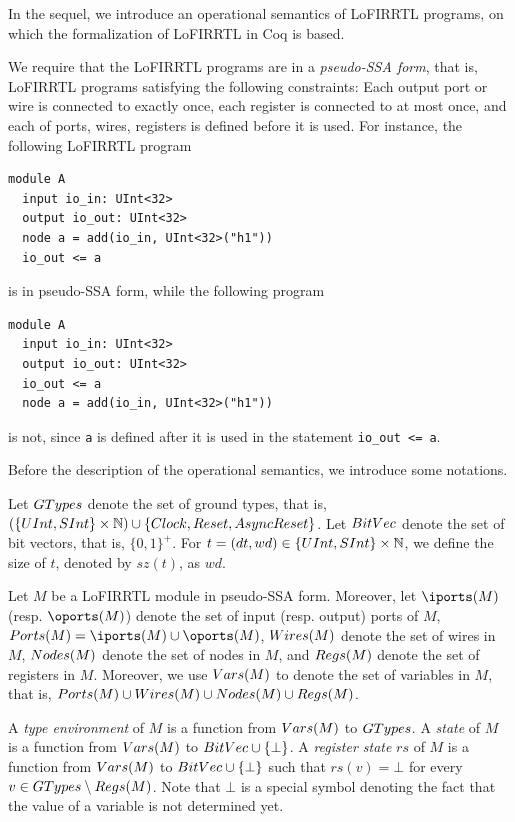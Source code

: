 
In the sequel, we introduce an operational semantics of LoFIRRTL programs, on which the formalization of LoFIRRTL in Coq is based. 

We require that the LoFIRRTL programs are in a \emph{pseudo-SSA form}, that is, LoFIRRTL programs satisfying the following constraints: Each output port or wire is connected to exactly once, each register is connected to at most once, and each of ports, wires, registers is defined before it is used. For instance, the following LoFIRRTL program
\begin{lstlisting}
module A
  input io_in: UInt<32>
  output io_out: UInt<32>
  node a = add(io_in, UInt<32>("h1"))
  io_out <= a
\end{lstlisting}
%
is in pseudo-SSA form, while the following program
\begin{lstlisting}
module A
  input io_in: UInt<32>
  output io_out: UInt<32>
  io_out <= a
  node a = add(io_in, UInt<32>("h1"))
\end{lstlisting}
is not, since {\tt a} is defined after it is used in the statement {\tt io\_out <= a}.

Before the description of the operational semantics, we introduce some notations. 

Let $GTypes$ denote the set of ground types, that is, $(\{UInt, SInt\} \times \mathbb{N}) \cup \{Clock, Reset, AsyncReset\}$. Let $BitVec$ denote the set of bit vectors, that is, $\{0,1\}^+$.
For $t = (dt, wd) \in \{UInt, SInt\} \times \mathbb{N}$, we define the size of $t$, denoted by $sz(t)$, as $wd$.

Let $M$ be a LoFIRRTL module in pseudo-SSA form. 
Moreover, let $\iports(M)$ (resp. $\oports(M)$) denote the set of input (resp. output) ports of $M$,  $\ports(M) = \iports(M) \cup \oports(M)$, $Wires(M)$ denote the set of wires in $M$, $Nodes(M)$ denote the set of nodes in $M$, and $Regs(M)$ denote the set of registers in $M$. Moreover, we use $Vars(M)$ to denote the set of variables in $M$, that is, $Ports(M) \cup Wires(M) \cup Nodes(M) \cup Regs(M)$.

A \emph{type environment} of $M$ is a function from $Vars(M)$ to $GTypes$.
A \emph{state} of $M$ is a function from $Vars(M)$ to $BitVec \cup \{\bot\}$. A \emph{register state} $rs$ of $M$ is a function from $Vars(M)$ to $BitVec \cup \{\bot\}$ such that $rs(v) = \bot$ for every $v \in GTypes \setminus Regs(M)$. Note that $\bot$ is a special symbol denoting the fact that the value of a variable is not determined yet. 

